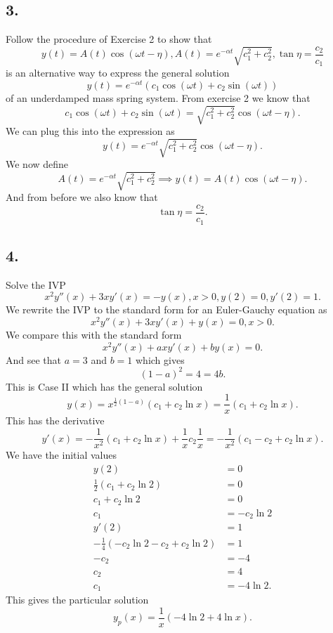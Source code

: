 \subsection*{3.} Follow the procedure of Exercise 2 to show that
\[ 
y(t) = A(t) \cos (\omega t - \eta), A(t) = e^{-\alpha t} \sqrt{c_1^2 + c_2^2}, \tan \eta = \frac{c_2}{c_1}
\]
is an alternative way to express the general solution
\[ 
y(t) = e^{-\alpha t} \left( c_1 \cos (\omega t) + c_2 \sin (\omega t) \right)
\]
of an underdamped mass spring system.
\bigbreak
From exercise 2 we know that
\[ 
c_1 \cos \left( \omega t \right) + c_2 \sin (\omega t) = \sqrt{c_1^2 + c_2^2} \cos(\omega t - \eta)
.\]
We can plug this into the expression as
\[ 
y(t) = e^{-\alpha t} \sqrt{c_1^2 + c_2^2} \cos \left( \omega t - \eta \right)
.\]
We now define
\[ 
A(t) = e^{-\alpha t} \sqrt{c_1^2 + c_2^2} \implies y(t) = A(t) \cos \left( \omega t - \eta \right)
.\]
And from before we also know that
\[ 
\tan \eta = \frac{c_2}{c_1}
.\]



\subsection*{4.} Solve the IVP
\[ 
x^2 y''(x) + 3xy'(x) = - y(x), x>0, y(2) = 0, y'(2) = 1
.\]
\bigbreak
We rewrite the IVP to the standard form for an Euler-Gauchy equation as
\[ 
x^2 y''(x) + 3xy'(x) + y(x) = 0, x>0
.\]
We compare this with the standard form
\[ 
x^2 y''(x) + axy'(x) + by(x) = 0
.\]
And see that $a = 3$ and $b = 1$ which gives
\[ 
(1-a)^2 = 4 = 4b
.\]
This is Case II which has the general solution
\[ 
y(x) = x^{\frac{1}{2} (1-a)} \left( c_1 + c_2 \ln x \right) = \frac{1}{x} \left( c_1 + c_2 \ln x \right)
.\]
This has the derivative
\[ 
  y'(x) = - \frac{1}{x^2} \left( c_1 + c_2 \ln x \right) + \frac{1}{x}c_2 \frac{1}{x} = - \frac{1}{x^2} \left( c_1 - c_2 + c_2 \ln x \right)
.\]
We have the initial values
\begin{align*}
  y(2) &= 0 \\
  \frac{1}{2} \left( c_1 + c_2 \ln 2 \right) &= 0 \\
  c_1 + c_2 \ln 2 &= 0 \\
  c_1 &= - c_2 \ln 2 \\
  y'(2) &= 1 \\
  - \frac{1}{4} \left( - c_2 \ln 2 - c_2 + c_2 \ln 2 \right) &= 1 \\
  -c_2 &= -4 \\
  c_2 &= 4 \\
  c_1 &= -4 \ln 2
.\end{align*}
This gives the particular solution
\[ 
y_p(x) = \frac{1}{x} \left( - 4 \ln 2 + 4 \ln x \right)
.\]

